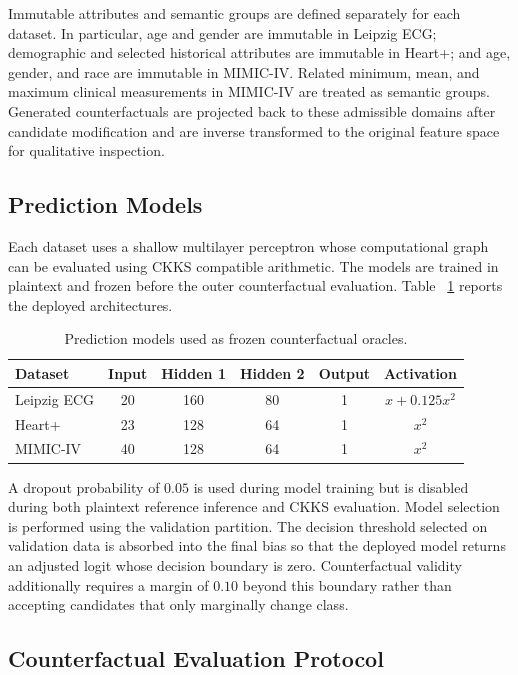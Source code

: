 \documentclass[preprint,12pt]{elsarticle}
\begin{document}
Immutable attributes and semantic groups are defined separately for each
dataset. In particular, age and gender are immutable in Leipzig ECG; demographic
and selected historical attributes are immutable in Heart+; and age, gender,
and race are immutable in MIMIC-IV. Related minimum, mean, and maximum clinical
measurements in MIMIC-IV are treated as semantic groups. Generated
counterfactuals are projected back to these admissible domains after candidate
modification and are inverse transformed to the original feature space for
qualitative inspection.

\subsection{Prediction Models}
\label{subsec:prediction_models}

Each dataset uses a shallow multilayer perceptron whose computational graph can
be evaluated using CKKS compatible arithmetic. The models are trained in
plaintext and frozen before the outer counterfactual evaluation. Table
~\ref{tab:predictor_architecture} reports the deployed architectures.

\begin{table}[!ht]
\centering
\caption{Prediction models used as frozen counterfactual oracles.}
\label{tab:predictor_architecture}
\begin{tabular}{lccccc}
\toprule
\textbf{Dataset}
& \textbf{Input}
& \textbf{Hidden 1}
& \textbf{Hidden 2}
& \textbf{Output}
& \textbf{Activation} \\
\midrule
Leipzig ECG & 20 & 160 & 80 & 1 & $x+0.125x^{2}$ \\
Heart+      & 23 & 128 & 64 & 1 & $x^{2}$ \\
MIMIC-IV    & 40 & 128 & 64 & 1 & $x^{2}$ \\
\bottomrule
\end{tabular}
\end{table}

A dropout probability of $0.05$ is used during model training but is disabled
during both plaintext reference inference and CKKS evaluation. Model selection
is performed using the validation partition. The decision threshold selected
on validation data is absorbed into the final bias so that the deployed model
returns an adjusted logit whose decision boundary is zero. Counterfactual
validity additionally requires a margin of $0.10$ beyond this boundary rather
than accepting candidates that only marginally change class.

\subsection{Counterfactual Evaluation Protocol}
\label{subsec:cfe_protocol}
\end{document}
